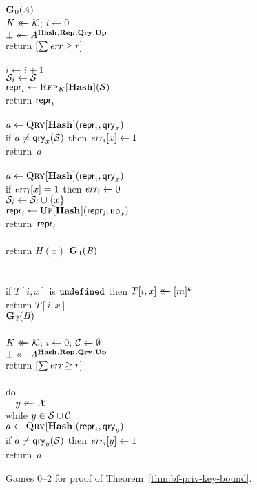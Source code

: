 \begin{figure*}
  {
    \underline{$\game_0(\advA)$}\\[2pt]
      $\key \getsr \keys$; $i \gets 0$\\
      $\bot \getsr \advA^{\HASHO,\REPO,\QRYO,\UPO}$\\
      return $[\sum \err \geq r]$
    \\[6pt]
    \oraclev{$\REPO(\col)$}\\[2pt]
      $i \gets i + 1$\\
      $\col_i \gets \col$\\
      $\pub_i \gets \Rep_K[\HASHO](\col)$\\
      return $\pub_i$
    \\[6pt]
    \\[2pt]
      $a \gets \Qry[\HASHO](\pub_i, \qry_x)$\\
      if $a \neq \qry_x(\col)$ then $\err_i[x] \gets 1$\\
      return~$a$
    \\[6pt]
    \\[2pt]
      $a \gets \Qry[\HASHO](\pub_i, \qry_x)$\\
      if $\err_i[x] = 1$ then $\err_i \gets 0$\\
      $\col_i \gets \col_i \union \{x\}$\\
      $\pub_i \gets \Up[\HASHO](\pub_i,\up_x)$\\
      return~$\pub_i$
    \\[4pt]
    \\[2pt]
      return $H(x)$
  }
  {
  \underline{$\game_1(\advB)$}\\[2pt]\\
    \\
      if $T[i, x]$ is $\undefn$ then $T[i, x] \getsr [m]^k$\\
      return $T[i, x]$
    \\[6pt]
    \underline{$\game_2(\advB)$}\\[2pt]\\
      $\key \getsr \keys$; $i \gets 0$; $\setC \gets \emptyset$\\
      $\bot \getsr \advA^{\HASHO,\REPO,\QRYO,\UPO}$\\
      return $[\sum \err \geq r]$
    \\[6pt]
    \\[2pt]
      do\\
      $\tab y \getsr \mathcal{X}$\\
      while $y \in \col \cup \setC$\\
      $a \gets \Qry[\HASHO](\pub_i, \qry_y)$\\
      if $a \neq \qry_y(\col)$ then $\err_i[y] \gets 1$\\
      return~$a$
  }
  {
  }
  {
  }
  \caption{Games 0--2 for proof of Theorem~\ref{thm:bf-priv-key-bound}.}
  \label{fig:bf-priv-salt-bound}
\end{figure*}

